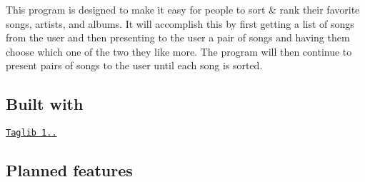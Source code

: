 This program is designed to make it easy for people to sort \& rank their favorite songs, artists, and albums. It will accomplish this by first getting a list of songs from the user and then presenting to the user a pair of songs and having them choose which one of the two they like more. The program will then continue to present pairs of songs to the user until each song is sorted.

\subsection*{Built with}

\href{http://taglib.org/}{\tt Taglib 1..}

\subsection*{Planned features}


